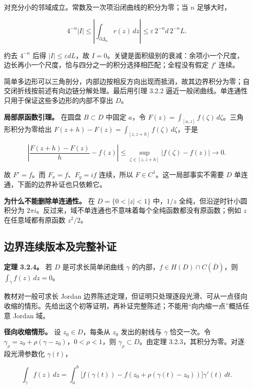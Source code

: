 \documentclass[11pt,a4paper]{article}
\begin{document}
对充分小的邻域成立。常数及一次项沿闭曲线的积分为零；当 \(n\) 足够大时，

\[
4^{-n}|I|
\le\left|\int_{\partial\Delta_n}r(z)\,dz\right|
\le\varepsilon\,2^{-n}d\,2^{-n}L.
\]

约去 \(4^{-n}\) 后得 \(|I|\le\varepsilon dL\)，故
\(I=0\)。关键是面积级别的衰减：余项小一个尺度，边长再小一个尺度，恰与四分之一的积分选择相匹配；全程没有假定
\(f'\) 连续。

简单多边形可以三角剖分，内部边按相反方向出现而抵消，故其边界积分为零；自交闭折线按前述有向边链分解处理。最后用引理
3.2.2 逼近一般闭曲线。单连通性只用于保证这些多边形的内部不穿出 \(D\)。

\textbf{局部原函数引理。} 在圆盘 \(B\subset D\) 中固定 \(a\)，令
\(F(z)=\int_{[a,z]}f(\zeta)\,d\zeta\)。三角形积分为零给出
\(F(z+h)-F(z)=\int_{[z,z+h]}f(\zeta)\,d\zeta\)，于是

\[
\left|\frac{F(z+h)-F(z)}h-f(z)\right|
\le\sup_{\zeta\in[z,z+h]}|f(\zeta)-f(z)|\longrightarrow0.
\]

故 \(F'=f\)。而 \(F_x=f\)、\(F_y=if\) 连续，所以
\(F\in C^1\)。这一局部事实不需要 \(D\)
单连通，下面的边界补证也只依赖它。

\textbf{为什么不能删除单连通性。} 在 \(D=\{0<|z|<1\}\) 中，\(1/z\)
全纯，但沿逆时针小圆积分为
\(2\pi i\)。反过来，域不单连通也不意味着每个全纯函数都没有原函数；例如
\(z\) 在任意域都有原函数 \(z^2/2\)。

\subsection{边界连续版本及完整补证}\label{ch03-s2-ux8fb9ux754cux8fdeux7eedux7248ux672cux53caux5b8cux6574ux8865ux8bc1}

\textbf{定理 3.2.4。} 若 \(D\) 是可求长简单闭曲线 \(\gamma\)
的内部，\(f\in H(D)\cap C(\overline D)\)，则
\(\int_\gamma f(z)\,dz=0\)。

教材对一般可求长 Jordan
边界陈述定理，但证明只处理逐段光滑、可从一点径向收缩的情形。先给出这个初等证明，再补证完整陈述；不能用``向内缩一点''概括任意
Jordan 域。

\textbf{径向收缩情形。} 设 \(z_0\in D\)，每条从 \(z_0\) 发出的射线与
\(\gamma\) 恰交一次。令
\(\gamma_\rho=z_0+\rho(\gamma-z_0)\)，\(0<\rho<1\)，则
\(\gamma_\rho\subset D\)。由定理 3.2.3，其积分为零。对逐段光滑参数化
\(\gamma(t)\)，

\[
\int_\gamma f(z)\,dz
=\int_a^b\bigl[f(\gamma(t))-f(z_0+\rho(\gamma(t)-z_0))\bigr]\gamma'(t)\,dt.
\]
\end{document}
